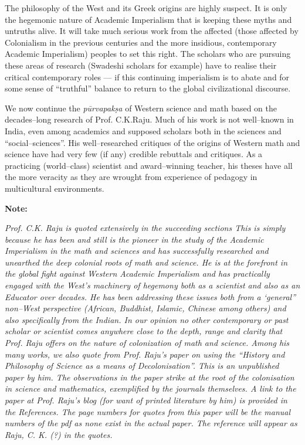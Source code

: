 The philosophy of the West and its Greek origins are highly suspect. It is only the hegemonic nature of Academic Imperialism that is keeping these myths and untruths alive. It will take much serious work from the affected (those affected by Colonialism in the previous centuries and the more insidious, contemporary Academic Imperialism) peoples to set this right. The scholars who are pursuing these areas of research (Swadeshi scholars for example) have to realise their critical contemporary roles — if this continuing imperialism is to abate and for some sense of “truthful” balance to return to the global civilizational discourse.

We now continue the \textit{pūrvapakṣa} of Western science and math based on the decades–long research of Prof. C.K.Raju. Much of his work is not well–known in India, even among academics and supposed scholars both in the sciences and “social–sciences”. His well–researched critiques of the origins of Western math and science have had very few (if any) credible rebuttals and critiques. As a practicing (world–class) scientist and award–winning teacher, his theses have all the more veracity as they are wrought from experience of pedagogy in multicultural environments.

\textbf{Note:}

\textit{Prof. C.K. Raju is quoted extensively in the succeeding sections This is simply because he has been and still is the pioneer in the study of the Academic Imperialism in the math and sciences and has successfully researched and unearthed the deep colonial roots of math and science. He is at the forefront in the global fight against Western Academic Imperialism and has practically engaged with the West’s machinery of hegemony both as a scientist and also as an Educator over decades. He has been addressing these issues both from a ‘general” non–West perspective (African, Buddhist, Islamic, Chinese among others) and also specifically from the Indian. In our opinion no other contemporary or past scholar or scientist comes anywhere close to the depth, range and clarity that Prof. Raju offers on the nature of colonization of math and science. Among his many works, we also quote from Prof. Raju’s paper on using the “History and Philosophy of Science as a means of Decolonisation”. This is an unpublished paper by him. The observations in the paper strike at the root of the colonisation in science and mathematics, exemplified by the journals themselves. A link to the paper at Prof. Raju’s blog (for want of printed literature by him) is provided in the References. The page numbers for quotes from this paper will be the manual numbers of the pdf as none exist in the actual paper. The reference will appear as Raju, C. K. (?) in the quotes.}

